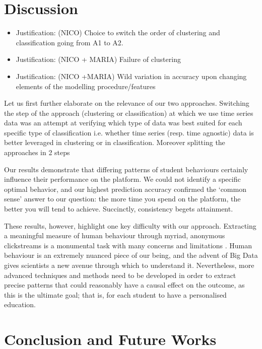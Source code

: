 \documentclass[sigplan,screen]{acmart}
\begin{document}
\section{Discussion}\label{sec:discussion}

{\color{red}
\begin{itemize}
\item Justification: (NICO) Choice to switch the order of clustering and classification going from A1 to A2. 
    \item Justification: (NICO + MARIA) Failure of clustering
    \item Justification: (NICO +MARIA) Wild variation in accuracy upon changing elements of the modelling procedure/features
\end{itemize}

}
Let us first further elaborate on the relevance of our two approaches. Switching the step of the approach (clustering or classification) at which we use time series data was an attempt at verifying which type of data was best suited for each specific type of classification i.e. whether time series (resp. time agnostic) data is better leveraged in clustering or in classification. Moreover splitting the approaches in 2 steps 

Our results demonstrate that differing patterns of student behaviours certainly influence their performance on the platform. We could not identify a specific optimal behavior, and our highest prediction accuracy confirmed the `common sense' answer to our question: the more time you spend on the platform, the better you will tend to achieve. Succinctly, consistency begets attainment. 

These results, however, highlight one key difficulty with our approach. Extracting a meaningful measure of human behaviour through myriad, anonymous clickstreams is a monumental task with many concerns and limitations \cite{meaningfulmeasures}. Human behaviour is an extremely nuanced piece of our being, and the advent of Big Data gives scientists a new avenue through which to understand it. Nevertheless, more advanced techniques and methods need to be developed in order to extract precise patterns that could reasonably have a causal effect on the outcome, as this is the ultimate goal; that is, for each student to have a personalised education. 





\section{Conclusion and Future Works}\label{sec:conclusion}
\end{document}
